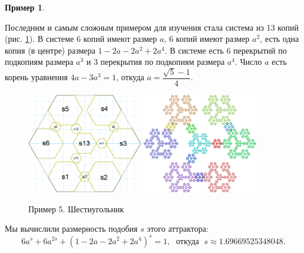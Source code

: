 \documentclass[a4paper,14pt]{extarticle} %
\newcommand{\0}{\varnothing}
\newcommand{\8}{\infty}
\theoremstyle{definition}
\newtheorem{example}{Пример}
\begin{document}
\begin{example}\label{ex:5}

Последним и самым сложным примером для изучения стала система из 13 копий (рис. \ref{fig:primer5_скелет}).
В системе 6 копий имеют размер $a$, 6 копий имеют размер $a^2$, есть одна копия (в центре) размера $1-2a-2a^2+2a^4$.
В системе есть 6 перекрытий по подкопиям размера $a^3$ и 3 перекрытия по подкопиям размера $a^4$.
Число $a$ есть корень уравнения $4a-3a^3=1$, откуда $a=\dfrac{\sqrt{5}-1}{4}$.

\begin{figure}[H]
    \centering    
    \includegraphics[width=0.45\textwidth]{extreme_skel_pod.png}
    \hfill
    \includegraphics[width=0.45\textwidth]{den_six_3_2_4_3_full.png}
    \caption{Пример 5. Шестиугольник}
    \label{fig:primer5_скелет}
\end{figure}
Мы вычислили размерность подобия $s$ этого аттрактора:
$$6a^s+6a^{2s}+(1-2a-2a^2+2a^4)^s=1,\;\text{ откуда }\; s\approx1.69669525348048.$$


\end{example}
\end{document}

